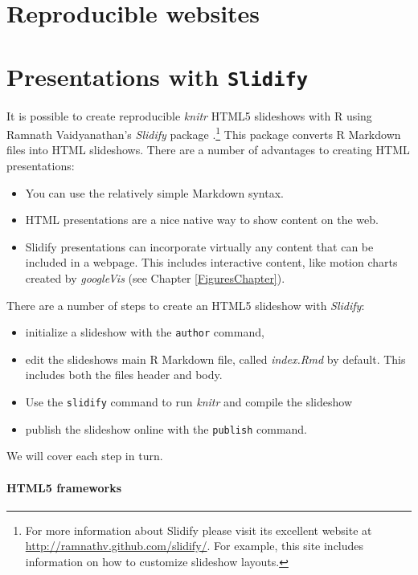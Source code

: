 \section{Reproducible websites}

\section{Presentations with \texttt{Slidify}}

It is possible to create reproducible \emph{knitr} HTML5 slideshows with R using Ramnath Vaidyanathan's \emph{Slidify} package \citeyearpar{R-slidify}.\footnote{For more information about Slidify please visit its excellent website at \url{http://ramnathv.github.com/slidify/}. For example, this site includes information on how to customize slideshow layouts.} This package converts R Markdown files into HTML slideshows. There are a number of advantages to creating HTML presentations:

\begin{itemize}
	\item You can use the relatively simple Markdown syntax.
	\item HTML presentations are a nice native way to show content on the web.
	\item Slidify presentations can incorporate virtually any content that can be included in a webpage. This includes interactive content, like motion charts created by \emph{googleVis} (see Chapter \ref{FiguresChapter}).
\end{itemize} 

\noindent There are a number of steps to create an HTML5 slideshow with \emph{Slidify}:

\begin{itemize}
	\item initialize a slideshow with the \verb|author| command,
	\item edit the slideshows main R Markdown file, called \emph{index.Rmd} by default. This includes both the files header and body.
	\item Use the \verb|slidify| command to run \emph{knitr} and compile the slideshow 
	\item publish the slideshow online with the \verb|publish| command.
\end{itemize}

\noindent We will cover each step in turn.

\paragraph{HTML5 frameworks}

